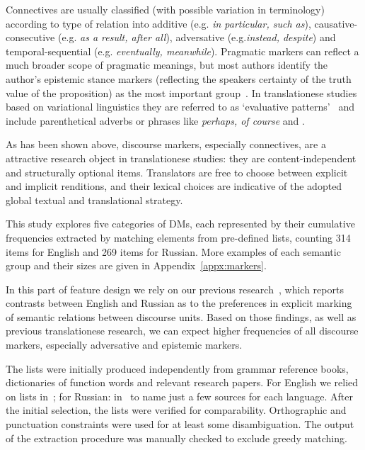 Connectives are usually classified (with possible variation in terminology) according to type of relation into additive (e.g. \textit{in particular, such as}), causative-consecutive (e.g. \textit{as a result, after all}), adversative (e.g.\textit{instead, despite}) and temporal-sequential (e.g. \textit{eventually, meanwhile}). 
Pragmatic markers can reflect a much broader scope of pragmatic meanings, but most authors identify the author's epistemic stance markers (reflecting the speakers certainty of the truth value of the proposition) as the most important group~\cite[see][]{Fraser2006,Halliday1989,Biber1999}. In translationese studies based on variational linguistics they are referred to as `evaluative patterns'~\cite{Lapshinova2017} and include parenthetical adverbs or phrases like \textit{perhaps, of course} and .

As has been shown above, discourse markers, especially connectives, are a attractive research object in translationese studies: they are content-independent and structurally optional items. Translators are free to choose between explicit and implicit renditions, and their lexical choices are indicative of the adopted global textual and translational strategy.

This study explores five categories of DMs, each represented by their cumulative frequencies extracted by matching elements from pre-defined lists, counting 314 items for English and 269 items for Russian. More examples of each semantic group and their sizes are given in Appendix~\ref{appx:markers}.

In this part of feature design we rely on our previous research~\cite{Kunilovskaya2017conn}, which reports contrasts between English and Russian as to the preferences in explicit marking of semantic relations between discourse units. Based on those findings, as well as previous translationese research, we can expect higher frequencies of all discourse markers, especially adversative and epistemic markers.

The lists were initially produced independently from grammar reference books, dictionaries of function words and relevant research papers. For English we relied on lists in~\citet{Biber1999,Fraser2006,Liu2008}; for Russian: in~\citet{Shvedova1980,Priyatkina2001,Novikova2008} to name just a few sources for each language. After the initial selection, the lists were verified for comparability. Orthographic and punctuation constraints were used for at least some disambiguation. The output of the extraction procedure was manually checked to exclude greedy matching.

